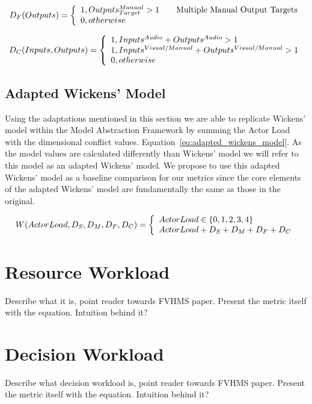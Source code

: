 \begin{equation}
D_{F}(Outputs) = \left\{ 
  \begin{array}{l l}
    1, Outputs_{Target}^{Manual} > 1 & \quad \text{Multiple Manual Output Targets}\\
    0, otherwise
  \end{array}
  \right.
  \label{eq:focus_dimension}
\end{equation}

\begin{equation}
D_{C}(Inputs, Outputs) = \left\{ 
  \begin{array}{l l}
    1, Inputs^{Audio} + Outputs^{Audio} > 1\\
    1, Inputs^{Visual/Manual} + Outputs^{Visual/Manual} > 1\\
    0, otherwise
  \end{array}
  \right.
  \label{eq:codes_dimension}
\end{equation}


\subsection{Adapted Wickens' Model}
Using the adaptations mentioned in this section we are able to replicate Wickens' model within the Model Abstraction Framework by summing the Actor Load with the dimensional conflict values.  Equation~\ref{eq:adapted_wickens_model}.  As the model values are calculated differently than Wickens' model we will refer to this model as an adapted Wickens' model.  We propose to use this adapted Wickens' model as a baseline comparison for our metrics since the core elements of the adapted Wickens' model are fundamentally the same as those in the original.  

\begin{equation}
W(ActorLoad, D_{S}, D_{M}, D_{F}, D_{C}) = \left\{ 
  \begin{array}{l l}
    ActorLoad \in \{0,1,2,3,4\}\\
    ActorLoad + D_{S} + D_{M} + D_{F} + D_{C}
  \end{array}
  \right.
  \label{eq:adapted_wickens_model}
\end{equation}

\section{Resource Workload}
Describe what it is, point reader towards FVHMS paper.  Present the metric itself with the equation.
Intuition behind it?

\section{Decision Workload}
Describe what decision workload is, point reader towards FVHMS paper.  Present the metric itself with the equation.
Intuition behind it?

